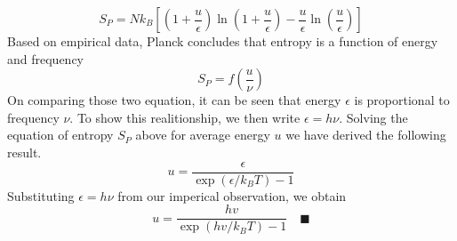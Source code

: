 \documentclass[../../../Main.tex]{subfiles}
\begin{document}
\begin{equation*}
    S_P=Nk_B\left[\left(1+\frac{u}{\epsilon} \right) \ln \left(1+\frac{u}{\epsilon}\right)-\frac{u}{\epsilon}\ln\left(\frac{u}{\epsilon}\right)\right]
\end{equation*}
Based on empirical data, Planck concludes that entropy is a function of energy and frequency
\begin{equation*}
    S_P=f\left(\frac{u}{\nu}\right)
\end{equation*}
On comparing those two equation, it can be seen that energy $\epsilon$ is proportional to frequency $\nu$. To show this realitionship, we then write $\epsilon=h\nu$. Solving the equation of entropy $S_P$ above for average energy $u$ we have derived the following result.
\begin{equation*}
    u=\frac{\epsilon}{\exp(\epsilon/k_BT)-1}
\end{equation*}
Substituting $\epsilon=h\nu$ from our imperical observation, we obtain
\begin{equation*}
    u=\frac{hv}{\exp(hv/k_BT)-1}\quad\blacksquare
\end{equation*}
\end{document}
